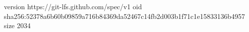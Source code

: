 version https://git-lfs.github.com/spec/v1
oid sha256:52378a6b60b09859a716b84369da52467c14fb2d003b1f71c1e15833136b4957
size 2034
